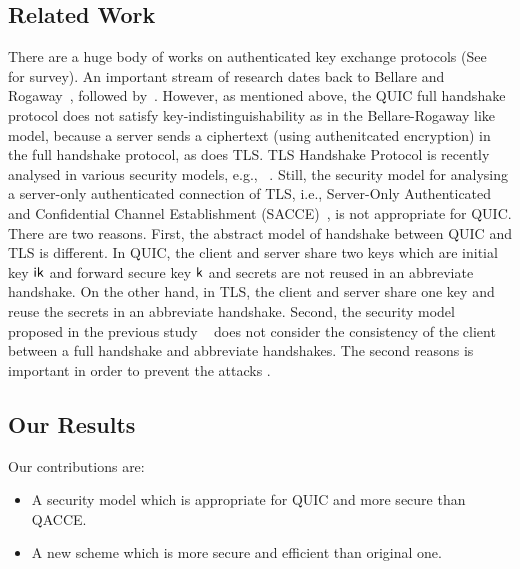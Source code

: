\subsection{Related Work} \label{sec:Related Work}
There are a huge body of works on authenticated key
exchange protocols (See~\cite{CK01:AKE} for survey).
An important stream of research dates back to Bellare
and Rogaway~\cite{BR93:AKE}, followed by~\cite{DB96,
Blei98,JMDP00,JB02,EK09,KK05:TLS,KCRE08,SMOAJ08,KTT11,
Kraw01}.
However, as mentioned above, the QUIC full handshake
protocol does not satisfy key-indistinguishability as
in the Bellare-Rogaway like model, because a server
sends a ciphertext (using authenitcated encryption) in
the full handshake protocol, as does TLS.
TLS Handshake Protocol is recently analysed in various
security models, e.g., ~\cite{JKSS12:ACCE,KPW13:SACCE,
FS13:ACCE,GKS13:RACCE,BDKSS14:SSH,BFKPSB14:TLS}.
Still, the security model for analysing a server-only
authenticated connection of TLS, i.e., Server-Only
Authenticated and Confidential Channel Establishment
(SACCE)~\cite{KPW13:SACCE}, is not appropriate for QUIC.
There are two reasons. First, the abstract model of
handshake between QUIC and TLS is different. In QUIC,
the client and server share two keys which are initial
key $\mathsf{ik}$ and forward secure key $\mathsf{k}$ and secrets are not
reused in an abbreviate handshake. On the other hand,
in TLS, the client and server share one key and reuse
the secrets in an abbreviate handshake. Second, the
security model proposed in the previous study
~\cite{FG14:QUIC,LJBN15:QUIC} does not
consider the consistency of the client between a full
handshake and abbreviate handshakes.
The second reasons is important in order to prevent the
attacks \cite{LJBN15:QUIC}.

\subsection{Our Results} \label{sec:proposal}

Our contributions are:
\begin{itemize}
 \item{A security model which is appropriate for QUIC
 and more secure than QACCE.}

 \item{A new scheme which is more secure and efficient
 than original one.}
\end{itemize}

